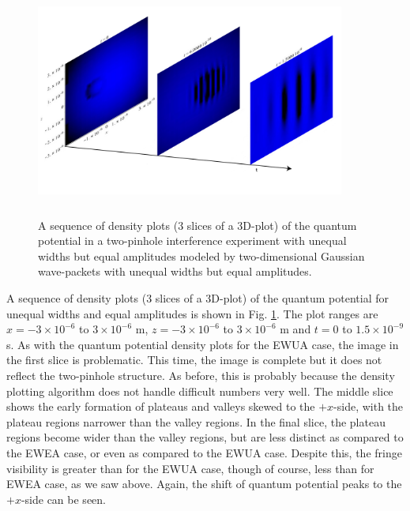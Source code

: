 \documentclass[12pt]{article}       %
\begin{document}
\begin{figure}[h]
\unitlength=1in 
\hspace*{1.0in}\includegraphics[width=4in,height=3in]  {figure19.jpg} 
\caption{A sequence of density plots (3 slices of a 3D-plot) of the quantum potential  in a two-pinhole interference experiment with unequal widths but equal amplitudes modeled by two-dimensional Gaussian wave-packets with unequal widths but equal amplitudes.\label{T2DGQPDPUW}}
\end{figure}
A sequence of density plots (3 slices of a 3D-plot) of the quantum potential  for unequal widths and equal amplitudes is shown in Fig.  \ref{T2DGQPDPUW}. The plot  ranges are $x=-3\times 10^{-6}$ to $3\times 10^{-6}$ m, $z=-3\times 10^{-6}$ to $3\times 10^{-6}$ m  and $t=0$ to $1.5\times 10^{-9}$ s. As with the quantum potential density plots for the EWUA case,  the image in the first slice is problematic. This time, the image is complete but it does not reflect the two-pinhole structure.  As before, this is probably because the density plotting algorithm does not handle difficult numbers very well. The middle slice shows the early formation of plateaus and valleys skewed to  the $+x$-side,  with the plateau regions narrower than the valley regions. In the final slice, the plateau regions become wider than the valley regions, but are less distinct as compared to  the EWEA case, or even as compared to the EWUA case. Despite this, the fringe visibility is greater than for the EWUA case, though of course, less than for EWEA case, as we saw above. Again, the shift of quantum potential peaks to the $+x$-side can be seen.
\end{document}
